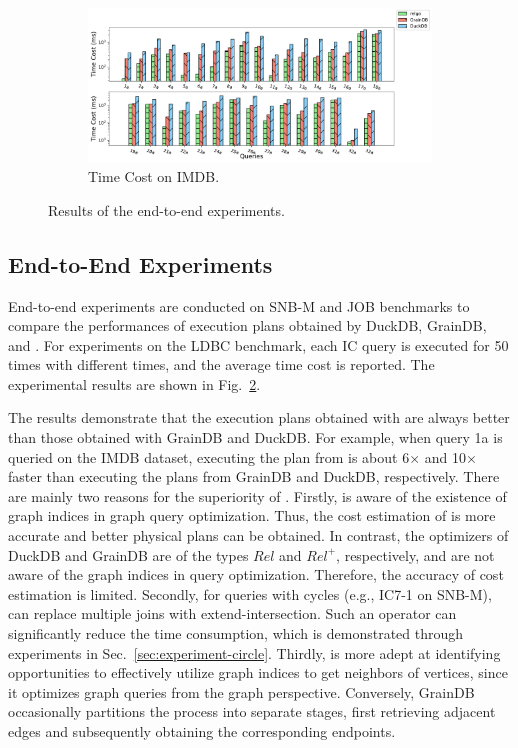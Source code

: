 \begin{figure}[ht]
\begin{subfigure}[b]{0.6\linewidth}
        \centering
        \includegraphics[width=\linewidth]{./figures/exp/e2e_job.pdf}
        \caption{Time Cost on IMDB.}
        \label{fig:exp-e2e-job}
    \end{subfigure}
    \caption{Results of the end-to-end experiments.}
    \label{fig:exp-e2e}
\end{figure}

\subsection{End-to-End Experiments}
\label{sec:experiment-e2e}

End-to-end experiments are conducted on SNB-M and JOB benchmarks to compare the performances of execution plans obtained by DuckDB, GrainDB, and \relgo.
For experiments on the LDBC benchmark, each IC query is executed for 50 times with different times, and the average time cost is reported.
The experimental results are shown in Fig.~\ref{fig:exp-e2e}.

The results demonstrate that the execution plans obtained with \relgo are always better than those obtained with GrainDB and DuckDB.
For example, when query 1a is queried on the IMDB dataset, executing the plan from \relgo is about 6$\times$ and 10$\times$ faster than executing the plans from GrainDB and DuckDB, respectively.
There are mainly two reasons for the superiority of \relgo.
Firstly, \relgo is aware of the existence of graph indices in graph query optimization.
Thus, the cost estimation of \relgo is more accurate and better physical plans can be obtained.
In contrast, the optimizers of DuckDB and GrainDB are of the types $Rel$ and $Rel^+$, respectively, and are not aware of the graph indices in query optimization.
Therefore, the accuracy of cost estimation is limited.
Secondly, for queries with cycles (e.g., IC7-1 on SNB-M), \relgo can replace multiple joins with extend-intersection.
Such an operator can significantly reduce the time consumption, which is demonstrated through experiments in Sec.~\ref{sec:experiment-circle}.
Thirdly, \relgo is more adept at identifying opportunities to effectively utilize graph indices to get neighbors of vertices, since it optimizes graph queries from the graph perspective.
Conversely, GrainDB occasionally partitions the process into separate stages, first retrieving adjacent edges and subsequently obtaining the corresponding endpoints.